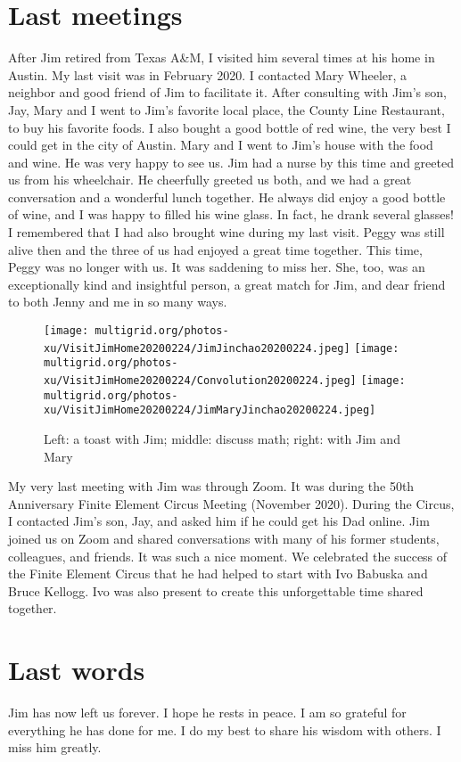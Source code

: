 \documentclass[CJK,11pt]{amsart}
\theoremstyle{definition}
\begin{document}
\begin{CJK*}{UTF8}{gbsn}
\section{Last meetings}
After Jim retired from Texas A\&M, I visited him several times at his home in Austin. My last visit was in February 2020. I contacted Mary Wheeler, a neighbor and good friend of Jim to facilitate it. After consulting with Jim's son, Jay, Mary and I went to Jim's favorite local place, the County Line Restaurant, to buy his favorite foods. I also bought a good bottle of red wine, the very best I could get in the city of Austin. Mary and I went to Jim's house with the food and wine. He was very happy to see us. Jim had a nurse by this time and greeted us from his wheelchair. He cheerfully greeted us both, and we had a great conversation and a wonderful lunch together. He always did enjoy a good bottle of wine, and I was happy to filled his wine glass. In fact, he drank several glasses! I remembered that I had also brought wine during my last visit. Peggy was still alive then and the three of us had enjoyed a great time together. This time, Peggy was no longer with us. It was saddening to miss her. She, too, was an exceptionally kind and insightful person, a great match for Jim, and dear friend to both Jenny and me in so many ways. 
\begin{figure}[h]
 \texttt{[image: multigrid.org/photos-xu/VisitJimHome20200224/JimJinchao20200224.jpeg]}
 \texttt{[image: multigrid.org/photos-xu/VisitJimHome20200224/Convolution20200224.jpeg]}
 \texttt{[image: multigrid.org/photos-xu/VisitJimHome20200224/JimMaryJinchao20200224.jpeg]}
 \caption{\tiny Left: a toast with Jim; middle: discuss math; right: with Jim and Mary}\label{Fig2}
\end{figure}
My very last meeting with Jim was through Zoom. It was during the 50th Anniversary Finite Element Circus Meeting (November 2020). During the Circus, I contacted Jim's son, Jay, and asked him if he could get his Dad online. Jim joined us on Zoom and shared conversations with many of his former students, colleagues, and friends. It was such a nice moment. We celebrated the success of the Finite Element Circus that he had helped to start with Ivo Babuska  and Bruce Kellogg.  Ivo was also present to create this unforgettable time shared together.
\section{Last words}
Jim has now left us forever. I hope he rests in peace. I am so grateful for everything he has done for me. I do my best to share his wisdom with others. I miss him greatly. 


\end{CJK*}
\end{document}
